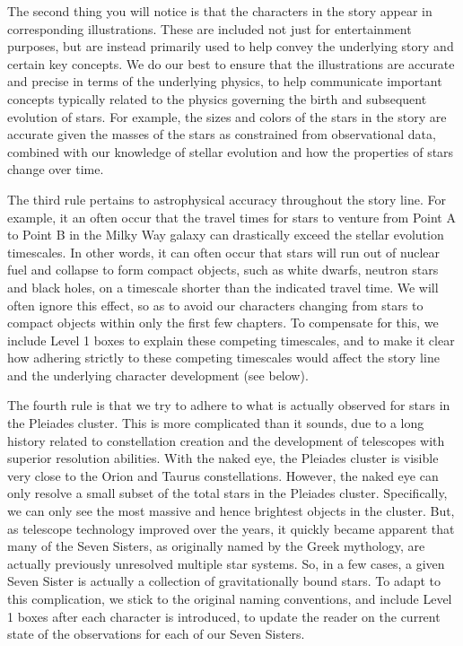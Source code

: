 \documentclass[main.tex]{subfiles}
\begin{document}

\par \nar The second thing you will notice is that the characters in the story appear in corresponding illustrations.  These are included not just for entertainment purposes, but are instead primarily used to help convey the underlying story and certain key concepts.  We do our best to ensure that the illustrations are accurate and precise in terms of the underlying physics, to help communicate important concepts typically related to the physics governing the birth and subsequent evolution of stars.  For example, the sizes and colors of the stars in the story are accurate given the masses of the stars as constrained from observational data, combined with our knowledge of stellar evolution and how the properties of stars change over time.

\par \nar The third rule pertains to astrophysical accuracy throughout the story line.  For example, it an often occur that the travel times for stars to venture from Point A to Point B in the Milky Way galaxy can drastically exceed the stellar evolution timescales.  In other words, it can often occur that stars will run out of nuclear fuel and collapse to form compact objects, such as white dwarfs, neutron stars and black holes, on a timescale shorter than the indicated travel time.  We will often ignore this effect, so as to avoid our characters changing from stars to compact objects within only the first few chapters.  To compensate for this, we include Level 1 boxes to explain these competing timescales, and to make it clear how adhering strictly to these competing timescales would affect the story line and the underlying character development (see below).

\par \nar The fourth rule is that we try to adhere to what is actually observed for stars in the Pleiades cluster.  This is more complicated than it sounds, due to a long history related to constellation creation and the development of telescopes with superior resolution abilities.  With the naked eye, the Pleiades cluster is visible very close to the Orion and Taurus constellations.  However, the naked eye can only resolve a small subset of the total stars in the Pleiades cluster.  Specifically, we can only see the most massive and hence brightest objects in the cluster.  But, as telescope technology improved over the years, it quickly became apparent that many of the Seven Sisters, as originally named by the Greek mythology, are actually previously unresolved multiple star systems.  So, in a few cases, a given Seven Sister is actually a collection of gravitationally bound stars.  To adapt to this complication, we stick to the original naming conventions, and include Level 1 boxes after each character is introduced, to update the reader on the current state of the observations for each of our Seven Sisters.
\end{document}
